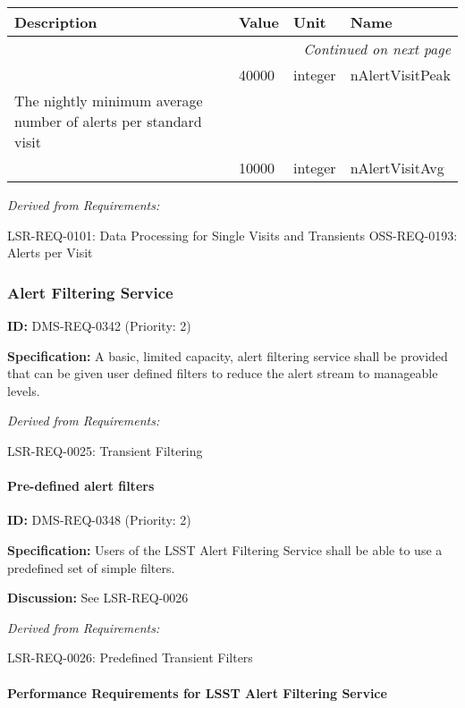 \documentclass[SE,toc,lsstdraft]{lsstdoc}
\makeatletter
\newcommand{\paramname}[1]{\hspace{0pt}#1}
\newcommand{\unitname}[1]{\hspace{0pt}#1}
\newenvironment{parameters}[0]{%
\setlength\LTleft{0pt}
\setlength\LTright{\fill}
\begin{small}
\begin{longtable}[]{|p{0.49\textwidth}|l|p{0.6in}|p{1.70in}@{}|}

\hline \textbf{Description} & \textbf{Value} & \textbf{Unit} & \textbf{Name} \\ \hline
\endhead

\hline \multicolumn{4}{r}{\emph{Continued on next page}} \\
\endfoot

\hline\hline
\endlastfoot
}{%
\hline
\end{longtable}
\end{small}
}
\makeatother
\begin{document}
\begin{parameters}

&
40000
&
\unitname{%
integer
}
&
\paramname{%
nAlertVisitPeak
} \\\hline
The nightly minimum average number of alerts per standard visit
\\
&
10000
&
\unitname{%
integer
}
&
\paramname{%
nAlertVisitAvg
} \\\hline
\end{parameters}

\emph{Derived from Requirements:}

LSR-REQ-0101:
Data Processing for Single Visits and Transients \newline
OSS-REQ-0193:
Alerts per Visit \newline

\subsubsection{Alert Filtering Service}

\label{DMS-REQ-0342}
\textbf{ID:} DMS-REQ-0342 (Priority: 2)

\textbf{Specification:} A basic, limited capacity, alert filtering service shall be provided that can be given user defined filters to reduce the alert stream to manageable levels.

\emph{Derived from Requirements:}

LSR-REQ-0025:
Transient Filtering \newline

\paragraph{Pre-defined alert filters}\hfill  %

\label{DMS-REQ-0348}
\textbf{ID:} DMS-REQ-0348 (Priority: 2)

\textbf{Specification: }Users of the LSST Alert Filtering Service shall be able to use a predefined set of simple filters.

\textbf{Discussion:} See LSR-REQ-0026

\emph{Derived from Requirements:}

LSR-REQ-0026:
Predefined Transient Filters \newline

\paragraph{Performance Requirements for LSST Alert Filtering Service}\hfill  %
\end{document}
